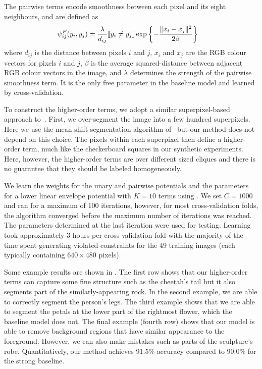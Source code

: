 \documentclass[twoside,doublespace,onecolumn,11pt,a4paper]{book}
\renewcommand{\citename}{\citet}
\begin{document}
The pairwise terms encode smoothness between each pixel and its
eight neighbours, and are defined as
%
\begin{align}
  \psi^P_{ij}(y_i, y_j) &= \frac{\lambda}{d_{ij}} \ind{y_i \neq y_j} \exp\left\{- \frac{\|x_i - x_j\|^2}{2 \beta}\right\}
\end{align}
%
where $d_{ij}$ is the distance between pixels $i$ and $j$, $x_i$
and $x_j$ are the RGB colour vectors for pixels $i$ and $j$,
$\beta$ is the average squared-distance between adjacent RGB
colour vectors in the image, and $\lambda$ determines the
strength of the pairwise smoothness term. It is the only free
parameter in the baseline model and learned by cross-validation.

To construct the higher-order terms, we adopt a similar
superpixel-based approach to~\citename{Ladicky:ICCV09}. First, we
over-segment the image into a few hundred superpixels. Here we
use the mean-shift segmentation algorithm
of~\citename{Comaniciu:PAMI02} but our method does not depend on
this choice. The pixels within each superpixel then define a
higher-order term, much like the checkerboard squares in our
synthetic experiments. Here, however, the higher-order terms are
over different sized cliques and there is no guarantee that they
should be labeled homogeneously.

We learn the weights for the unary and pairwise potentials and
the parameters for a lower linear envelope potential with $K =
10$ terms using . We set $C = 1000$ and ran
for a maximum of 100 iterations, however, for most
cross-validation folds, the algorithm converged before the
maximum number of iterations was reached. The parameters
determined at the last iteration were used for testing. Learning
took approximately 3 hours per cross-validation fold with the
majority of the time spent generating violated constraints for
the 49 training images (each typically containing $640\times480$
pixels).

Some example results are shown in %
. The first row shows that our higher-order terms can capture
some fine structure such as the cheetah's tail but it also
segments part of the similarly-appearing rock. In the second
example, we are able to correctly segment the person's legs. The
third example shows that we are able to segment the petals at the
lower part of the rightmost flower, which the baseline model does
not. The final example (fourth row) shows that our model is able
to remove background regions that have similar appearance to the
foreground. However, we can also make mistakes such as parts of
the sculpture's robe. Quantitatively, our method achieves 91.5\%
accuracy compared to 90.0\% for the strong baseline.
\end{document}
